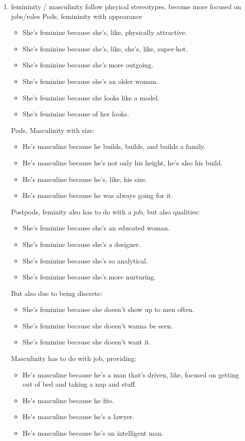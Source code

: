 \documentclass[11pt]{article}
\begin{document}
\begin{enumerate}
\begin{enumerate}
\item femininity / masculinity follow phsyical stereotypes, become more focused on jobs/roles
\label{sec:org08e77bc}
Pods, femininity with appearance
\begin{itemize}
\item She's feminine because she's, like, physically attractive.
\item She's feminine because she's, like, she's, like, super-hot.
\item She's feminine because she's more outgoing.
\item She's feminine because she's an older woman.
\item She's feminine because she looks like a model.
\item She's feminine because of her looks.
\end{itemize}

Pods, Masculinity with size:
\begin{itemize}
\item He's masculine because he builds, builds, and builds a family.
\item He's masculine because he's not only his height, he's also his build.
\item He's masculine because he's, like, his size.
\item He's masculine because he was always going for it.
\end{itemize}

Postpods, feminity also has to do with a job, but also qualities: 
\begin{itemize}
\item She's feminine because she's an educated woman.
\item She's feminine because she's a designer.
\item She's feminine because she's so analytical.
\item She's feminine because she's more nurturing.
\end{itemize}

But also due to being discrete:
\begin{itemize}
\item She's feminine because she doesn't show up to men often.
\item She's feminine because she doesn't wanna be seen.
\item She's feminine because she doesn't want it.
\end{itemize}

Masculinity has to do with job, providing:
\begin{itemize}
\item He's masculine because he's a man that's driven, like, focused on getting out of bed and taking a nap and stuff.
\item He's masculine because he fits.
\item He's masculine because he's a lawyer.
\item He's masculine because he's an intelligent man.
\end{itemize}


\end{enumerate}
\end{enumerate}
\end{document}
